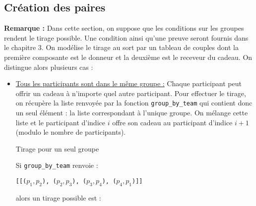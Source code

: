 \documentclass[a4paper, 12pt]{report}
\begin{document}
        \subsection{Création des paires}
            \textbf{Remarque :} Dans cette section, on suppose que les conditions sur les groupes rendent le tirage possible. Une condition ainsi qu'une preuve seront fournis dans le chapitre 3.
            \bigbreak
            On modélise le tirage au sort par un tableau de couples dont la première composante est le donneur et la deuxième est le receveur du cadeau. On distingue alors plusieurs cas : 
            \bigbreak
            \begin{itemize}
                \item \underline{Tous les participants sont dans le même groupe :} Chaque participant peut offrir un cadeau à n'importe quel autre participant. Pour effectuer le tirage, on récupère la liste renvoyée par la fonction \texttt{group\_by\_team} qui contient donc un seul élément : la liste correspondant à l'unique groupe. On mélange cette liste et le participant d'indice $i$ offre son cadeau au participant d'indice $i+1$ (modulo le nombre de participants).
                \bigbreak
                \begin{example}[sidebyside]{Tirage pour un seul groupe}{}
                    \begin{center}
                    \end{center}
                    \tcblower
                    Si \texttt{group\_by\_team} renvoie :
                    
                    \texttt{[[($p_1, p_2$), ($p_2, p_3$), ($p_3, p_4$), ($p_4, p_1$)]]}
                    
                    alors un tirage possible est : 
                    

\end{example}
\end{itemize}
\end{document}
